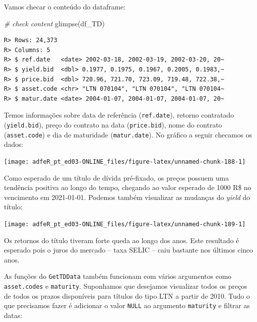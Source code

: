 \documentclass[
  11pt,
]{book}
\newenvironment{Shaded}{\begin{snugshade}}{\end{snugshade}}
\newcommand{\CommentTok}[1]{\textcolor[rgb]{0.37,0.37,0.37}{\textit{#1}}}
\newcommand{\FunctionTok}[1]{\textcolor[rgb]{0,0,0}{#1}}
\newcommand{\NormalTok}[1]{#1}
\begin{document}
Vamos checar o conteúdo do dataframe:

\begin{Shaded}
\begin{Highlighting}[]
\CommentTok{\# check content}
\FunctionTok{glimpse}\NormalTok{(df\_TD)}
\end{Highlighting}
\end{Shaded}

\begin{verbatim}
R> Rows: 24,373
R> Columns: 5
R> $ ref.date   <date> 2002-03-18, 2002-03-19, 2002-03-20, 20~
R> $ yield.bid  <dbl> 0.1977, 0.1975, 0.1967, 0.2005, 0.1983,~
R> $ price.bid  <dbl> 720.96, 721.70, 723.09, 719.48, 722.38,~
R> $ asset.code <chr> "LTN 070104", "LTN 070104", "LTN 070104~
R> $ matur.date <date> 2004-01-07, 2004-01-07, 2004-01-07, 20~
\end{verbatim}

Temos informações sobre data de referência (\texttt{ref.date}), retorno contratado (\texttt{yield.bid}), preço do contrato na data (\texttt{price.bid}), nome do contrato (\texttt{asset.code}) e dia de maturidade (\texttt{matur.date}). No gráfico a seguir checamos os dados:

\begin{center}\texttt{[image: adfeR\_pt\_ed03-ONLINE\_files/figure-latex/unnamed-chunk-188-1]} \end{center}

Como esperado de um título de dívida pré-fixado, os preços possuem uma tendência positiva ao longo do tempo, chegando ao valor esperado de 1000 R\$ no vencimento em 2021-01-01. Podemos também visualizar as mudanças do \emph{yield} do título:

\begin{center}\texttt{[image: adfeR\_pt\_ed03-ONLINE\_files/figure-latex/unnamed-chunk-189-1]} \end{center}

Os retornos do título tiveram forte queda ao longo dos anos. Este resultado é esperado pois o juros do mercado -- taxa SELIC -- caiu bastante nos últimos cinco anos.

As funções do \texttt{GetTDData} também funcionam com vários argumentos como \texttt{asset.codes} e \texttt{maturity}. Suponhamos que desejamos visualizar todos os preços de todos os prazos disponíveis para títulos do tipo LTN a partir de 2010. Tudo o que precisamos fazer é adicionar o valor \texttt{NULL} ao argumento \texttt{maturity} e filtrar as datas:
\end{document}
